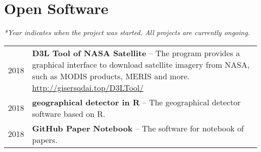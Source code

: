 \section*{Open Software}

\textit{*Year indicates when the project was started. All projects are currently ongoing.}

\begin{tabular}{p{} p{}}
2018 & \textbf{D3L Tool of NASA Satellite} -- The program provides a graphical interface to download satellite imagery from NASA, such as MODIS products, MERIS and more. \newline
       \url{http://gisersqdai.top/D3LTool/} \\
2018 & \textbf{geographical detector in R} -- The geographical detector software based on R.\\
2018 & \textbf{GitHub Paper Notebook} -- The software for notebook of papers.\\
\end{tabular}
